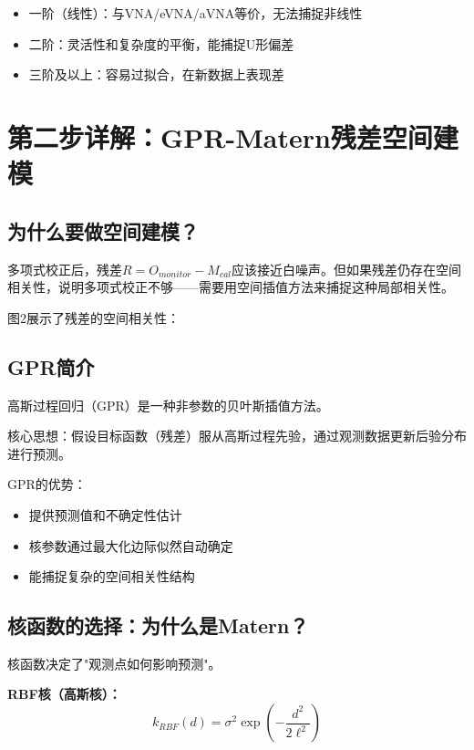 \documentclass[UTF8, a4paper, 12pt]{article}
\begin{document}
\begin{itemize}
    \item 一阶（线性）：与VNA/eVNA/aVNA等价，无法捕捉非线性
    \item 二阶：灵活性和复杂度的平衡，能捕捉U形偏差
    \item 三阶及以上：容易过拟合，在新数据上表现差
\end{itemize}

\section{第二步详解：GPR-Matern残差空间建模}

\subsection{为什么要做空间建模？}

多项式校正后，残差$R = O_{monitor} - M_{cal}$应该接近白噪声。但如果残差仍存在空间相关性，说明多项式校正不够——需要用空间插值方法来捕捉这种局部相关性。

图2展示了残差的空间相关性：

\begin{figure}[htbp]
\centering
{}
\end{figure}

\subsection{GPR简介}

高斯过程回归（GPR）是一种非参数的贝叶斯插值方法。

核心思想：假设目标函数（残差）服从高斯过程先验，通过观测数据更新后验分布进行预测。

GPR的优势：
\begin{itemize}
    \item 提供预测值和不确定性估计
    \item 核参数通过最大化边际似然自动确定
    \item 能捕捉复杂的空间相关性结构
\end{itemize}

\subsection{核函数的选择：为什么是Matern？}

核函数决定了"观测点如何影响预测"。

\textbf{RBF核（高斯核）：}
\begin{equation}
k_{RBF}(d) = \sigma^2 \exp\left(-\frac{d^2}{2\ell^2}\right)
\end{equation}
\end{document}
